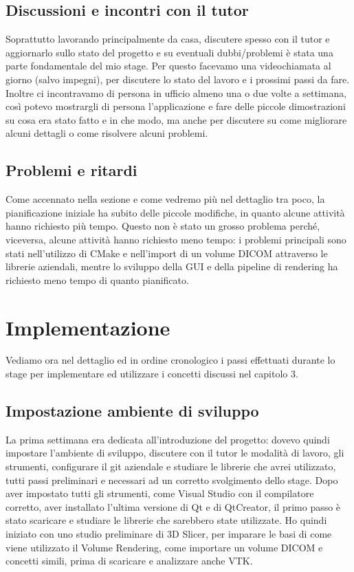 \subsection{Discussioni e incontri con il tutor}
Soprattutto lavorando principalmente da casa, discutere spesso con il tutor e aggiornarlo sullo stato del progetto e su eventuali dubbi/problemi è stata una parte fondamentale del mio stage. Per questo facevamo una videochiamata al giorno (salvo impegni), per discutere lo stato del lavoro e i prossimi passi da fare. Inoltre ci incontravamo di persona in ufficio almeno una o due volte a settimana, così potevo mostrargli di persona l'applicazione e fare delle piccole dimostrazioni su cosa era stato fatto e in che modo, ma anche per discutere su come migliorare alcuni dettagli o come risolvere alcuni problemi.

\subsection{Problemi e ritardi}\label{sec:problemi-ritardi}
Come accennato nella sezione  e come vedremo più nel dettaglio tra poco, la pianificazione iniziale ha subito delle piccole modifiche, in quanto alcune attività hanno richiesto più tempo. Questo non è stato un grosso problema perché, viceversa, alcune attività hanno richiesto meno tempo: i problemi principali sono stati nell'utilizzo di CMake e nell'import di un volume DICOM attraverso le librerie aziendali, mentre lo sviluppo della GUI e della pipeline di rendering ha richiesto meno tempo di quanto pianificato.

\section{Implementazione}
Vediamo ora nel dettaglio ed in ordine cronologico i passi effettuati durante lo stage per implementare ed utilizzare i concetti discussi nel capitolo 3.

\subsection{Impostazione ambiente di sviluppo}
La prima settimana era dedicata all'introduzione del progetto: dovevo quindi impostare l'ambiente di sviluppo, discutere con il tutor le modalità di lavoro, gli strumenti, configurare il git aziendale e studiare le librerie che avrei utilizzato, tutti passi preliminari e necessari ad un corretto svolgimento dello stage.
Dopo aver impostato tutti gli strumenti, come Visual Studio con il compilatore corretto, aver installato l'ultima versione di Qt e di QtCreator, il primo passo è stato scaricare e studiare le librerie che sarebbero state utilizzate. Ho quindi iniziato con uno studio preliminare di 3D Slicer, per imparare le basi di come viene utilizzato il Volume Rendering, come importare un volume DICOM e concetti simili, prima di scaricare e analizzare anche VTK. 

